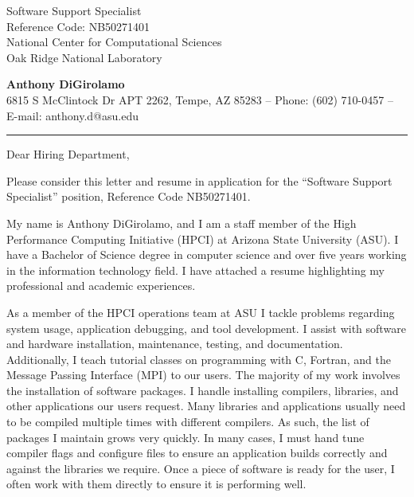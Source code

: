 \documentclass[11pt,letterpaper]{letter}
\begin{document}
\begin{letter}{
Software Support Specialist \\
Reference Code: NB50271401\\
National Center for Computational Sciences\\
Oak Ridge National Laboratory
}

\begin{flushleft}
{\Large\bf Anthony DiGirolamo}\\
{\small 6815 S McClintock Dr APT 2262, Tempe, AZ 85283 -- Phone: (602) 710-0457 -- E-mail: anthony.d@asu.edu}
\vskip 1.5pt
\hrule height 0.4pt
\end{flushleft}

\opening{ Dear Hiring Department, }

\noindent Please consider this letter and resume in application for the
``Software Support Specialist'' position, Reference Code NB50271401.

\noindent My name is Anthony DiGirolamo, and I am a staff member of the High
Performance Computing Initiative (HPCI) at Arizona State University (ASU). I
have a Bachelor of Science degree in computer science and over five years
working in the information technology field.
I have attached a resume highlighting my professional and academic experiences.


\noindent As a member of the HPCI operations team at ASU I tackle problems
regarding system usage, application debugging, and tool development. I assist
with software and hardware installation, maintenance, testing, and
documentation. Additionally, I teach tutorial classes on programming with C,
Fortran, and the Message Passing Interface (MPI) to our users.  The majority of
my work involves the installation of software packages. I handle installing
compilers, libraries, and other applications our users request. Many libraries
and applications usually need to be compiled multiple times with different
compilers. As such, the list of packages I maintain grows very quickly. In many
cases, I must hand tune compiler flags and configure files to ensure an
application builds correctly and against the libraries we require. Once a piece
of software is ready for the user, I often work with them directly to ensure it
is performing well.


\end{letter}
\end{document}
